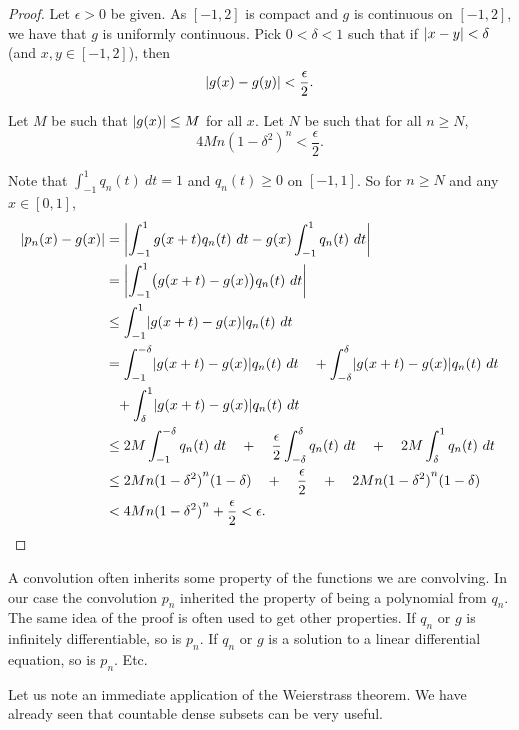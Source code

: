 \begin{proof}
Let $\epsilon > 0$ be given.
As $[-1,2]$ is compact and $g$ is continuous on $[-1,2]$, we have that $g$ is uniformly continuous.
Pick $0 < \delta < 1$ such that if
$\lvert {x-y} \rvert < \delta$ (and $x,y \in [-1,2]$), then
\begin{equation*}
\lvert {g(x)-g(y)} \rvert < \frac{\epsilon}{2} .
\end{equation*}

Let $M$ be such that $\lvert {g(x)} \rvert \leq M$ for all $x$.  Let $N$ be
such that for all $n \geq N$,
\begin{equation*}
4M n{(1-\delta^2)}^n < \frac{\epsilon}{2} .
\end{equation*}

Note that 
$\int_{-1}^1 q_n(t) ~ dt = 1$ and $q_n(t) \geq 0$ on $[-1,1]$.  So for $n
\geq N$ and any $x \in [0,1]$,
\begin{equation*}
\begin{split}
\lvert {p_n(x)-g(x)} \rvert & =
\left\lvert {\int_{-1}^1 g(x+t)q_n(t) ~ dt
-g(x)\int_{-1}^1 q_n(t) ~ dt} \right\rvert \\
& =
\left\lvert {\int_{-1}^1 \bigl(g(x+t)-g(x)\bigr)q_n(t) ~ dt} \right\rvert \\
& \leq
\int_{-1}^1 \lvert {g(x+t)-g(x)} \rvert q_n(t) ~ dt \\
& =
\int_{-1}^{-\delta} \lvert {g(x+t)-g(x)} \rvert q_n(t) ~ dt
\quad +
\int_{-\delta}^{\delta} \lvert {g(x+t)-g(x)} \rvert q_n(t) ~ dt
\\
& \phantom{\leq} +
\int_{\delta}^1 \lvert {g(x+t)-g(x)} \rvert q_n(t) ~ dt \\
& \leq
2M
\int_{-1}^{-\delta} q_n(t) ~ dt
\quad
+
\quad
\frac{\epsilon}{2}
\int_{-\delta}^{\delta} q_n(t) ~ dt
\quad
+
\quad
2M
\int_{\delta}^1 q_n(t) ~ dt \\
& \leq
2M n{(1-\delta^2)}^n(1-\delta)
\quad
+
\quad
\frac{\epsilon}{2}
\quad
+
\quad
2M n{(1-\delta^2)}^n(1-\delta) \\
& <
4M n{(1-\delta^2)}^n
+
\frac{\epsilon}{2}
< \epsilon . \qedhere
\end{split}
\end{equation*}
\end{proof}

A convolution often inherits some property of the functions we are convolving.
In our case the convolution $p_n$ inherited the property of being a
polynomial from $q_n$.  The same idea of the proof is often used 
to get other properties.  If $q_n$ or $g$ is infinitely differentiable, so is $p_n$.
If $q_n$ or $g$ is a solution to a linear differential equation, so is $p_n$.
Etc.

Let us note an immediate application of the Weierstrass theorem.  We have
already seen that countable dense subsets can be very useful.


